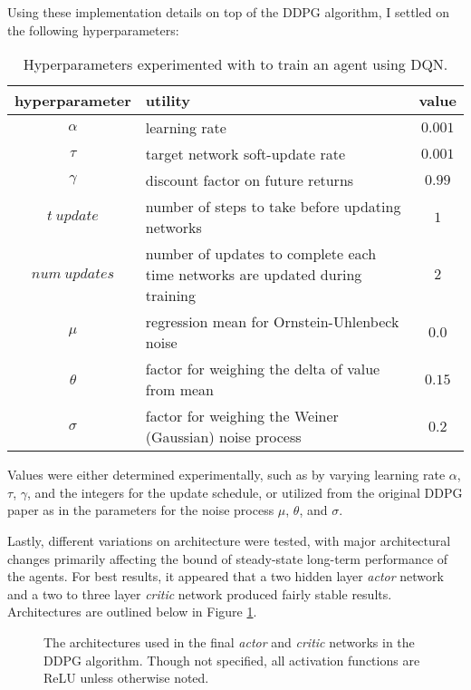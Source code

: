\documentclass[11pt]{article}
\begin{document}
	\FloatBarrier
	
	Using these implementation details on top of the DDPG algorithm, I settled on the following hyperparameters:
	
	\FloatBarrier
	
	\begin{table}[!ht]
		\centering
		\begin{tabular}{ c | p{6cm} | c }
			\textbf{hyperparameter} & \textbf{utility} & \textbf{value} \\
			\hline
			$\alpha$ & learning rate & $0.001$ \\
			$\tau$ & target network soft-update rate & $0.001$ \\
			$\gamma$ & discount factor on future returns & $0.99$ \\
			$t\ update$ & number of steps to take before updating networks & $1$ \\
			$num\ updates$ & number of updates to complete each time networks are updated during training & $2$ \\
			$\mu$ & regression mean for Ornstein-Uhlenbeck noise & $0.0$ \\
			$\theta$ & factor for weighing the delta of value from mean & $0.15$ \\
			$\sigma$ & factor for weighing the Weiner (Gaussian) noise process & $0.2$ \\
			\hline
		\end{tabular}
		\caption{Hyperparameters experimented with to train an agent using DQN.}
		\label{tbl:parameters}
	\end{table}
	
	Values were either determined experimentally, such as by varying learning rate $\alpha$, $\tau$, $\gamma$, and the integers for the update schedule, or utilized from the original DDPG paper \cite{ddpg} as in the parameters for the noise process $\mu$, $\theta$, and $\sigma$.
	
	Lastly, different variations on architecture were tested, with major architectural changes primarily affecting the bound of steady-state long-term performance of the agents. For best results, it appeared that a two hidden layer \textit{actor} network and a two to three layer \textit{critic} network produced fairly stable results. Architectures are outlined below in Figure \ref{fig:nn-architecture}.
	
	\FloatBarrier
	
	\begin{figure}[!ht]
		\centering
		\caption{The architectures used in the final \textit{actor} and \textit{critic} networks in the DDPG algorithm. Though not specified, all activation functions are ReLU unless otherwise noted.}
		\label{fig:nn-architecture}
	\end{figure}
	
\end{document}
